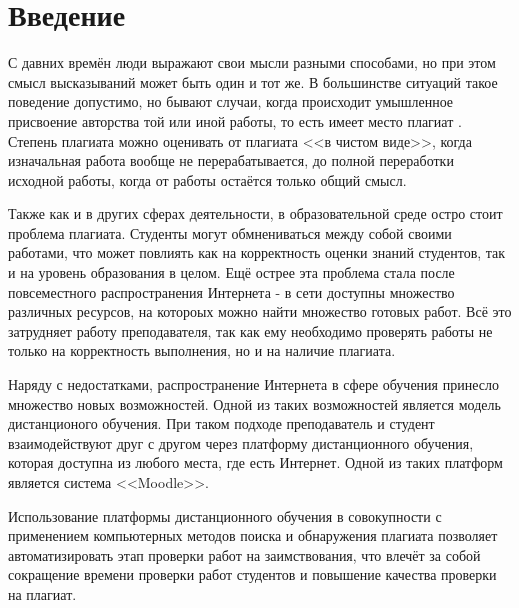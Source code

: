 \section*{Введение}

	С давних времён люди выражают свои мысли разными способами, но при этом смысл высказываний может быть один и тот же. В большинстве ситуаций такое поведение допустимо, но бывают случаи, когда происходит умышленное присвоение авторства той или иной работы, то есть имеет место плагиат \cite{Plagiat2002}. Степень плагиата можно оценивать от плагиата <<в чистом виде>>, когда изначальная работа вообще не перерабатывается, до полной переработки исходной работы, когда от работы остаётся только общий смысл.

	Также как и в других сферах деятельности, в образовательной среде остро стоит проблема плагиата. Студенты могут обмнениваться между собой своими работами, что может повлиять как на корректность оценки знаний студентов, так и на уровень образования в целом. Ещё острее эта проблема стала после повсеместного распространения Интернета - в сети доступны множество различных ресурсов, на котороых можно найти множество готовых работ. Всё это затрудняет работу преподавателя, так как ему необходимо проверять работы не только на корректность выполнения, но и на наличие плагиата.

	Наряду с недостатками, распространение Интернета в сфере обучения принесло множество новых возможностей. Одной из таких возможностей является модель дистанционого обучения. При таком подходе преподаватель и студент взаимодействуют друг с другом через платформу дистанционного обучения, которая доступна из любого места, где есть Интернет. Одной из таких платформ является система <<Moodle>>.

	Использование платформы дистанционного обучения в совокупности с применением компьютерных методов поиска и обнаружения плагиата позволяет автоматизировать этап проверки работ на заимствования, что влечёт за собой сокращение времени проверки работ студентов и повышение качества проверки на плагиат.